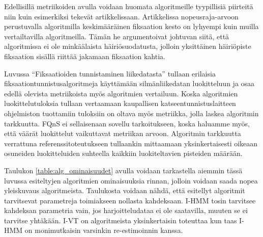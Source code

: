 Edellisillä metriikoiden avulla voidaan huomata algoritmeille tyypillisiä piirteitä niin kuin esimerkiksi \citet[s. 195]{nystrom2010} tekevät artikkelissaan. Artikkelissa nopeusraja-arvoon perustuvalla algoritmilla keskimääräinen fiksaation kesto on lyhyempi kuin muilla vertailtavilla algoritmeilla. Tämän he argumentoivat johtuvan siitä, että algoritmissa ei ole minkäälaista häiriösuodatusta, jolloin yksittäinen häiriöpiste fiksaation sisällä riittää jakamaan fiksaation kahtia.

Luvussa ``Fiksaatioiden tunnistaminen liikedatasta'' tullaan erilaisia fiksaationtunnistusalgoritmeja käyttämään silmänliikedatan luokitteluun ja osaa edellä olevista metriikoista myös algoritmien vertailuun. Koska algoritmien luokittelutuloksia tullaan vertaamaan kaupallisen katseentunnistuslaitteen ohjelmiston tuottamiin tuloksiin on oltava myös metriikka, jolla laskea algoritmin tarkkuutta. FQnS ei sellaisenaan sovellu tarkoitukseen, koska haluamme myös, että väärät luokittelut vaikuttavat metriikan arvoon. Algoritmin  tarkkuutta verrattuna referenssitoteutukseen tullaankin mittaamaan yksinkertaisesti oikeaan osuneiden luokitteluiden suhteella kaikkiin luokiteltavien pisteiden määrään.

Taulukon \ref{table:alg_ominaisuudet} avulla voidaan tarkastella aiemmin tässä luvussa esiteltyjen algoritmien ominaisuuksia rinnan, jolloin voidaan saada nopea yleiskuvaus algoritmeista. Taulukosta voidaan nähdä, että esitellyt algoritmit tarvitsevat parametreja toimiakseen nollasta kahdeksaan. I-HMM tosin tarvitsee kahdeksan parametria vain, jos harjoitteludataa ei ole saatavilla, muuten se ei tarvitse yhtäkään. I-VT on algoritmeista yksinkertaisin toteuttaa kun taas I-HMM on monimutkaisin varsinkin re-estimoinnin kanssa. 

